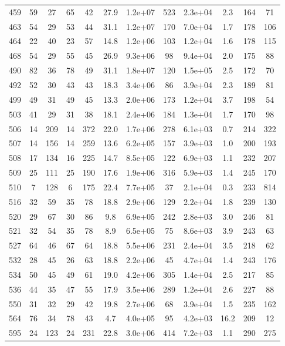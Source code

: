 \begin{table}
\begin{tabular}{cccccccccccc}
459 & 59 & 27 & 65 & 42 & 27.9 & 1.2e+07 & 523 & 2.3e+04 & 2.3 & 164 & 71 \\
463 & 54 & 29 & 53 & 44 & 31.1 & 1.2e+07 & 170 & 7.0e+04 & 1.7 & 178 & 106 \\
464 & 22 & 40 & 23 & 57 & 14.8 & 1.2e+06 & 103 & 1.2e+04 & 1.6 & 178 & 115 \\
468 & 54 & 29 & 55 & 45 & 26.9 & 9.3e+06 & 98 & 9.4e+04 & 2.0 & 175 & 88 \\
490 & 82 & 36 & 78 & 49 & 31.1 & 1.8e+07 & 120 & 1.5e+05 & 2.5 & 172 & 70 \\
492 & 52 & 30 & 43 & 43 & 18.3 & 3.4e+06 & 86 & 3.9e+04 & 2.3 & 189 & 81 \\
499 & 49 & 31 & 49 & 45 & 13.3 & 2.0e+06 & 173 & 1.2e+04 & 3.7 & 198 & 54 \\
503 & 41 & 29 & 31 & 38 & 18.1 & 2.4e+06 & 184 & 1.3e+04 & 1.7 & 170 & 98 \\
506 & 14 & 209 & 14 & 372 & 22.0 & 1.7e+06 & 278 & 6.1e+03 & 0.7 & 214 & 322 \\
507 & 14 & 156 & 14 & 259 & 13.6 & 6.2e+05 & 157 & 3.9e+03 & 1.0 & 200 & 193 \\
508 & 17 & 134 & 16 & 225 & 14.7 & 8.5e+05 & 122 & 6.9e+03 & 1.1 & 232 & 207 \\
509 & 25 & 111 & 25 & 190 & 17.6 & 1.9e+06 & 316 & 5.9e+03 & 1.4 & 245 & 170 \\
510 & 7 & 128 & 6 & 175 & 22.4 & 7.7e+05 & 37 & 2.1e+04 & 0.3 & 233 & 814 \\
516 & 32 & 59 & 35 & 78 & 18.8 & 2.9e+06 & 129 & 2.2e+04 & 1.8 & 239 & 130 \\
520 & 29 & 67 & 30 & 86 & 9.8 & 6.9e+05 & 242 & 2.8e+03 & 3.0 & 246 & 81 \\
521 & 32 & 54 & 35 & 78 & 8.9 & 6.5e+05 & 75 & 8.6e+03 & 3.9 & 243 & 63 \\
527 & 64 & 46 & 67 & 64 & 18.8 & 5.5e+06 & 231 & 2.4e+04 & 3.5 & 218 & 62 \\
532 & 28 & 45 & 26 & 63 & 18.8 & 2.2e+06 & 45 & 4.7e+04 & 1.4 & 243 & 176 \\
534 & 50 & 45 & 49 & 61 & 19.0 & 4.2e+06 & 305 & 1.4e+04 & 2.5 & 217 & 85 \\
536 & 44 & 35 & 47 & 55 & 17.9 & 3.5e+06 & 289 & 1.2e+04 & 2.6 & 227 & 88 \\
550 & 31 & 32 & 29 & 42 & 19.8 & 2.7e+06 & 68 & 3.9e+04 & 1.5 & 235 & 162 \\
564 & 76 & 34 & 78 & 43 & 4.7 & 4.0e+05 & 95 & 4.2e+03 & 16.2 & 209 & 12 \\
595 & 24 & 123 & 24 & 231 & 22.8 & 3.0e+06 & 414 & 7.2e+03 & 1.1 & 290 & 275 \\

\end{tabular}
\end{table}
